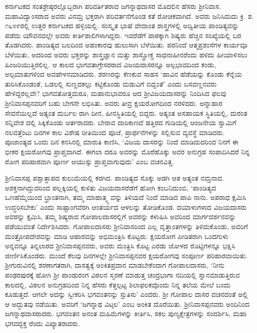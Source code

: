 ಕರ್ನಾಟಕದ ಸಂತಶ್ರೇಷ್ಠರಲ್ಲೊಬ್ಬರಾಗಿ ಪರಿವರ್ತಿತರಾದ ಜಗನ್ನಾಥದಾಸರ ಮೊದಲಿನ ಹೆಸರು ಶ‍್ರೀನಿವಾಸ. ಮಹಾವಿದ್ವಾಂಸರಾದ ಅವರು ವಿನಮ್ರ ಭಕ್ತರಾಗಿ ಪರಿವರ್ತನೆಗೊಂಡ ಕತೆ ರೋಚಕವಾಗಿದೆ. ಅವರು ಜನಿಸಿದುದು ಕ್ರಿ. ಶ. ೧೬೪೯ರಲ್ಲಿ ಉತ್ತರ ಕರ್ನಾಟಕದ ಹಳ್ಳಿಯಲ್ಲಿ. ಸಂಸ್ಕೃತ ಭಾಷೆ ವೇದಾಂತ ಶಾಸ್ತ್ರಗಳಲ್ಲಿ ಅದ್ವಿತೀಯ ಪಾಂಡಿತ್ಯವನ್ನು ಪಡೆದು ಯೌವನದಲ್ಲೇ ಅವರು ಕೀರ್ತಿಶಾಲಿಗಳಾಗಿದ್ದರು. ಇವರೆಡೆಗೆ ಪಾಠಕ್ಕಾಗಿ ಶಿಷ್ಯರು ಹೆಚ್ಚಿನ ಸಂಖ್ಯೆಯಲ್ಲಿ ಬರ ತೊಡಗಿದರು. ಪಾಂಡಿತ್ಯದ ಬಲದಿಂದ ಅಹಂಕಾರವು ಹುಲುಸಾಗಿ ಬೆಳೆಯಿತು. ಪರನಿಂದೆ ಆತ್ಮಪ್ರಶಂಸೆಗಳ ಕಾರ್ಯವೂ ಬೆಳೆಯಿತು. ಅದರಿಂದ ಅವರು ಭಕ್ತರನ್ನು ಶಾಸ್ತ್ರಜ್ಞಾನ ಮತ್ತು ಶಾಸ್ತ್ರೋಕ್ತ ಸಾಧನಾಹೀನರೆಂದು ಹಳಿದು ಹೀಯಾಳಿಸಲು ಹಿಂಜರಿಯುತ್ತಿರಲಿಲ್ಲ. ಆ ಕಾಲದ ಭಾಗವತಾಗ್ರೇಸರರಾದ ವಿಜಯದಾಸರನ್ನೂ ಅಲ್ಪಭಾವದಿಂದ ಕಂಡು, ಅಲ್ಪಮಾತುಗಳಿಂದ ಅವಹೇಳನಮಾಡಿದರು. ಶರಣರನ್ನು ಕೆಣಕುವ ಸಾಹಸ ‘ಹಾವಿನ ಹೆಡೆಯನ್ನು ಕೊಂಡು ಕೆನ್ನೆಯ ತುರಿಸಿಕೊಂಡಂತೆ, ಒಡಲಲ್ಲಿ ಸುಣ್ಣದಕಲ್ಲು ಕಟ್ಟಿಕೊಂಡು ಮಡುವಿಗೆ ಬಿದ್ದಂತೆ’ ಎಂದು ಬಸವಣ್ಣನವರು ಹೇಳಿದ್ದರಲ್ಲವೇ? ಭಾಗವತೋತ್ತಮರೂ, ಮಹಾನುಭಾವರೂ ಆದ ಶ‍್ರೀವಿಜಯದಾಸರನ್ನು ನಿಂದಿಸಿದ ಫಲವು ಶ‍್ರೀನಿವಾಸಪ್ಪನವರಿಗೆ ಬಹು ಬೇಗನೇ ಲಭಿಸಿತು. ಅವರು ತೀವ್ರ ಕ್ಷಯರೋಗದಿಂದ ನರಳಿದರು. ಅನ್ನಾಹಾರ ಸೇವನೆಯಿಲ್ಲದೆ ಅತ್ಯಂತ ದುರ್ಬಲ ರಾಗಿ ದೀನ, ಹೀನಸ್ಥಿತಿಯಲ್ಲಿ ಬಿದ್ದರು. ಅತ್ಯಂತ ಅಸಹಾಯಕ ಸ್ಥಿತಿಯಲ್ಲಿ, ದುರಂತ ಸನ್ನಿವೇಶ ದಲ್ಲಿ ಸಿಕ್ಕಿಕೊಂಡು ಆರ್ತರಾದರು. ಬೇರಾವ ದಾರಿಕಾಣದೆ ಹತ್ತಿರದ ಗುಡಿಯಲ್ಲಿ ಆಂಜನೇಯ ಸ್ವಾಮಿಗೆ ನಲವತ್ತೆಂಟು ದಿನಗಳ ಕಾಲ ವಿಶೇಷ ರೀತಿಯಿಂದ ಪೂಜೆ, ಪ್ರಾರ್ಥನೆಗಳನ್ನು ಸಲ್ಲಿಸುವ ವ್ಯವಸ್ಥೆ ಮಾಡಿದರು. ಪೂಜಾಂತ್ಯದ ಒಂದು ದಿನ ಕನಸಿನಲ್ಲಿ ಮಾರುತಿ ಕಾಣಿಸಿ, ‘ವಿಜಯ ದಾಸರನ್ನು ನಿಂದೆ ಮಾಡಿದುದರಿಂದ ನಿನಗೆ ಈ ಭೀಕರ ಕ್ಷಯರೋಗವು ಪ್ರಾಪ್ತವಾಗಿದೆ. ಈಗಲಾ ದರೂ ಅವರನ್ನು ಮೊರೆಹೊಕ್ಕು ಅವರ ಅನುಗ್ರಹ ಸಂಪಾದಿಸಿದರೆ ನಿನ್ನ ರೋಗ ಪರಿಹಾರವಾಗಿ ಪೂರ್ಣ ಆಯುಸ್ಸು ಪ್ರಾಪ್ತವಾಗುವುದು’ ಎಂಬ ವಚನವಿತ್ತ.

ಶ‍್ರೀನಿವಾಸಪ್ಪ ಪಶ್ಚಾತ್ತಾಪದ ಕುಲುಮೆಯಲ್ಲಿ ಕರಗಿದ. ಪಾಂಡಿತ್ಯದ ಸೊಕ್ಕು ಅಡಗಿ ಆತ ಅತ್ಯಂತ ನಮ್ರನಾದ. ಅಶಕ್ತನಾಗಿದ್ದುದರಿಂದ ಪಲ್ಲಕ್ಕಿಯಲ್ಲಿ ಕುಳಿತು ವಿಜಯದಾಸರೆಡೆಗೆ ಹೋಗಿ ಕಂಬನಿದುಂಬಿ, ‘ಪಾಂಡಿತ್ಯದ ಒಣಹೆಮ್ಮೆಯಿಂದ ಭ್ರಾಂತನಾಗಿ, ತಮ್ಮ ಮಾಹಾತ್ಮ್ಯ ವನ್ನು ತಿಳಿಯದೆ ನಿಂದೆ ಮಾಡಿದ ಪಾಪಿ ನಾನು. ಅಪರಾಧ ಕ್ಷಮಿಸಿ ಉದ್ಧರಿಸಬೇಕು’ ಎಂದು ಸಾಷ್ಟಾಂಗವೆರಗಿ ಆಂತರ್ಯದ ಆಳಲನ್ನು ತೋಡಿಕೊಂಡ. ದಯಾಳುಗಳಾದ ವಿಜಯದಾಸರು ಅವರನ್ನು ಕ್ಷಮಿಸಿ, ತಮ್ಮ ಶಿಷ್ಯರಾದ ಗೋಪಾಲದಾಸರಲ್ಲಿಗೆ ಅವರನ್ನು ಕಳುಹಿಸಿ ಅವರಿಂದ ಮಾರ್ಗದರ್ಶನವನ್ನು ಪಡೆಯುವಂತೆ ನಿರ್ದೇಶಿಸಿದರು. ಗೋಪಾಲದಾಸರು ಶ‍್ರೀನಿವಾಸರಿಂದ ಎಲ್ಲ ವೃತ್ತಾಂತಗಳನ್ನು ತಿಳಿದುಕೊಂಡು, ಅವರಿಗೆ ಮಂತ್ರೋಪದೇಶವನ್ನು ಮಾಡಿ ಆಹಾರವನ್ನು ಅಭಿಮಂತ್ರಿಸಿ ಕೊಟ್ಟರು. ಕ್ಷಯರೋಗ ಪೀಡಿತರಾಗಿ ಒಂದಗುಳು ಅನ್ನವನ್ನೂ ತಿನ್ನಲಾರದ ಶ‍್ರೀನಿವಾಸಪ್ಪನವರು, ಅವರು ಮಂತ್ರಿಸಿ ಕೊಟ್ಟ ಎರಡು ಜೋಳದ ರೊಟ್ಟಿಗಳನ್ನೂ ಭಕ್ಷಿಸಿ ಜೀರ್ಣಿಸಿಕೊಂಡರು. ಮುಂದೆ ಕೆಲವು ದಿನಗಳಲ್ಲೇ ಶ‍್ರೀನಿವಾಸಪ್ಪನವರ ಕ್ಷಯರೋಗವು ಸಂಪೂರ್ಣ ಪರಿಹಾರವಾಯಿತು. ಶ‍್ರೀಗುರುವಿನಲ್ಲಿ ಶರಣಾಗತರಾಗಿ, ದಾಸತ್ವಕ್ಕೆ ಅಂಕಿತಪ್ರದಾನ ಮಾಡಬೇಕೆಂದಾಗ ಗೋಪಾಲದಾಸರು, ‘ನೀನು ಪಂಢರಪುರಕ್ಕೆ ಹೋಗಿ ಶ‍್ರೀ ಪಾಂಡುರಂಗ ವಿಠಲನ ಸ್ಮರಣೆ ಮಾಡುತ್ತ ಚಂದ್ರಭಾಗಾ ನದಿಯಲ್ಲಿ ಸ್ನಾನಮಾಡುತ್ತಿರುವ ಕಾಲದಲ್ಲಿ, ವಿಠಲನ ಅನುಗ್ರಹದಿಂದ ನಿನ್ನ ಹೆಸರು ಕೆತ್ತಲ್ಪಟ್ಟ ಶಿಲಾಫಲಕವೊಂದು ನಿನ್ನ ತಲೆಯ ಮೇಲೆ ಬಂದು ಕೂಡುತ್ತದೆ. ಆಗಲೇ ಅದನ್ನು ಸ್ವೀಕರಿಸಿ ಭಗವಂತನನ್ನು ಸ್ತುತಿಸು’ ಎಂದರು. ಶ‍್ರೀ ಗೋಪಾಲ ದಾಸರ ವಚನದಂತೆ ಅಲ್ಲಿ ಆ ಅದ್ಭುತವು ನಡೆಯಿತು. ಅವರಿಗೆ ‘ಜಗನ್ನಾಥ ವಿಟ್ಠಲ’ ಎಂಬ ಅಂಕಿತ ದೊರೆಯಿತು. ಶ‍್ರೀನಿವಾಸಪ್ಪನವರು ಅಂದಿನಿಂದ ಜಗನ್ನಾಥದಾಸರಾದರು. ಭಗವಂತನ ಅನಂತ ಮಹಿಮೆಗಳನ್ನು ಕೀರ್ತಿಸಿ, ಸಕಲ ಪುಣ್ಯಕ್ಷೇತ್ರಗಳನ್ನು ಸಂದರ್ಶಿಸಿ, ಮಹಾ ಭಗವದ್ಭಕ್ತ ರೆಂದು ವಿಖ್ಯಾತರಾದರು.

